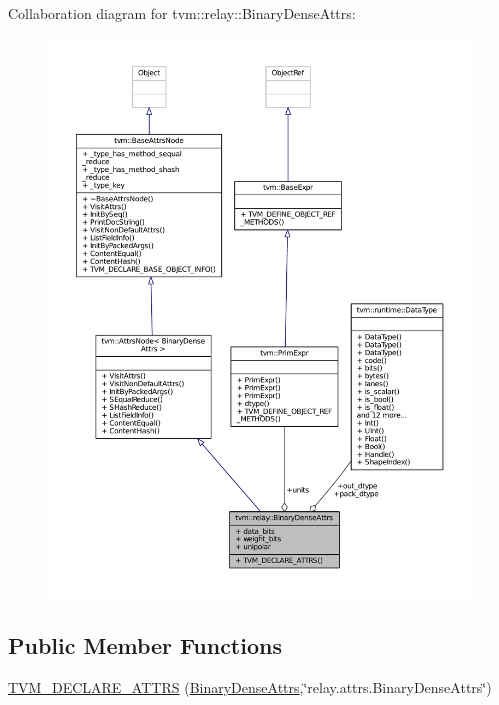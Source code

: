 Collaboration diagram for tvm\+:\+:relay\+:\+:Binary\+Dense\+Attrs\+:
\nopagebreak
\begin{figure}[H]
\begin{center}
\leavevmode
\includegraphics[width=350pt]{structtvm_1_1relay_1_1BinaryDenseAttrs__coll__graph}
\end{center}
\end{figure}
\subsection*{Public Member Functions}
\begin{DoxyCompactItemize}
\item 
\hyperlink{structtvm_1_1relay_1_1BinaryDenseAttrs_af47db15b68e233040e647eec83013990}{T\+V\+M\+\_\+\+D\+E\+C\+L\+A\+R\+E\+\_\+\+A\+T\+T\+RS} (\hyperlink{structtvm_1_1relay_1_1BinaryDenseAttrs}{Binary\+Dense\+Attrs},\char`\"{}relay.\+attrs.\+Binary\+Dense\+Attrs\char`\"{})
\end{DoxyCompactItemize}
